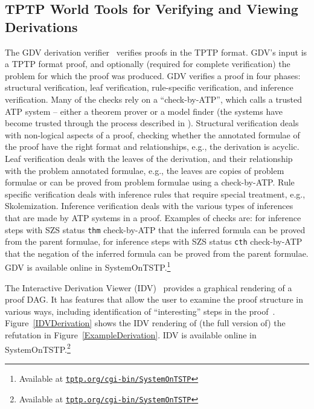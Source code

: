 \documentclass{ceurart}
\newcommand{\smalltt}[1]{\small \texttt{#1}}
\begin{document}
\subsection{TPTP World Tools for Verifying and Viewing Derivations}
\label{DerivationTools}

The GDV derivation verifier~\cite{Sut06} verifies proofs in the TPTP format.
GDV's input is a TPTP format proof, and optionally (required for complete verification) the 
problem for which the proof was produced.
GDV verifies a proof in four phases: structural verification, leaf verification,
rule-specific verification, and inference verification.
Many of the checks rely on a ``check-by-ATP'', which calls a trusted ATP system -- either a theorem 
prover or a model finder
(the systems have become trusted through the process described in \cite{SBB25}).
Structural verification deals with non-logical aspects of a proof, checking whether the 
annotated formulae of the proof have the right format and relationships, e.g., the derivation is 
acyclic. 
Leaf verification deals with the leaves of the derivation, and their relationship with
the problem annotated formulae, e.g., the leaves are copies of problem formulae or can be proved 
from problem formulae using a check-by-ATP.
Rule specific verification deals with inference rules that require special treatment, e.g.,
Skolemization. 
Inference verification deals with the various types of inferences that are made by ATP
systems in a proof.
Examples of checks are: for inference steps with SZS status \smalltt{thm} check-by-ATP that the 
inferred formula can be proved from the parent formulae, for inference steps with SZS status 
\smalltt{cth} check-by-ATP that the negation of the inferred formula can be proved from the 
parent formulae.
GDV is available online in SystemOnTSTP.\footnote{%
Available at \href{https://tptp.org/cgi-bin/SystemOnTSTP}{\tt tptp.org/cgi-bin/SystemOnTSTP}}

The Interactive Derivation Viewer (IDV)~\cite{TPS07} provides a graphical rendering of a proof DAG. 
It has features that allow the user to examine the proof structure in various ways, including 
identification of ``interesting'' steps in the proof~\cite{PGS06}.
Figure~\ref{IDVDerivation} shows the IDV rendering of (the full version of) the refutation in 
Figure~\ref{ExampleDerivation}.
IDV is available online in SystemOnTSTP.\footnote{%
Available at \href{https://tptp.org/cgi-bin/SystemOnTSTP}{\tt tptp.org/cgi-bin/SystemOnTSTP}}
\end{document}
